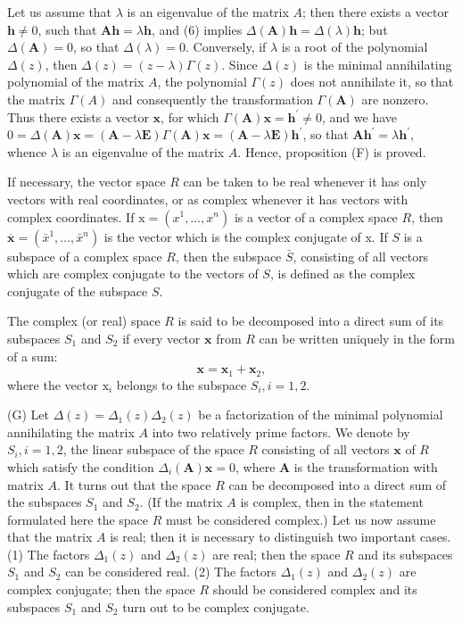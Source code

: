 \documentclass[10pt,a5paper]{book}
\theoremstyle{plain}
\theoremstyle{definition}
\theoremstyle{remark}
\begin{document}
Let us assume that $\lambda$ is an eigenvalue of the matrix $A$; then there exists a vector $\mathbf{h} \neq 0$, such that $\mathbf{A h}=\lambda \mathbf{h}$, and (6) implies $\Delta(\mathbf{A}) \mathbf{h}=\Delta(\lambda) \mathbf{h}$; but $\Delta(\mathbf{A})=0$, so that $\Delta(\lambda)=0$. Conversely, if $\lambda$ is a root of the polynomial $\Delta(z)$, then $\Delta(z)=(z-\lambda) \Gamma(z)$. Since $\Delta(z)$ is the minimal annihilating polynomial of the matrix $A$, the polynomial $\Gamma(z)$ does not annihilate it, so that the matrix $\Gamma(A)$ and consequently the transformation $\Gamma(\mathbf{A})$ are nonzero. Thus there exists a vector $\mathbf{x}$, for which $\Gamma(\mathbf{A}) \mathbf{x}=\mathbf{h}^{\prime} \neq 0$, and we have $0=\Delta(\mathbf{A}) \mathbf{x}=(\mathbf{A}-\lambda \mathbf{E}) \Gamma(\mathbf{A}) \mathbf{x}=(\mathbf{A}-\lambda \mathbf{E}) \mathbf{h}^{\prime}$, so that
$\mathbf{A h}^{\prime}=\lambda \mathbf{h}^{\prime}$, whence $\lambda$ is an eigenvalue of the matrix $A$. Hence, proposition (F) is proved.

If necessary, the vector space $R$ can be taken to be real whenever it has only vectors with real coordinates, or as complex whenever it has vectors with complex coordinates. If $\mathrm{x}=\left(x^{1}, \ldots, x^{n}\right)$ is a vector of a complex space $R$, then $\overline{\mathbf{x}}=\left(\bar{x}^{1}, \ldots, \bar{x}^{n}\right)$ is the vector which is the complex conjugate of x. If $S$ is a subspace of a complex space $R$, then the subspace $\bar{S}$, consisting of all vectors which are complex conjugate to the vectors of $S$, is defined as the complex conjugate of the subspace $S$.

The complex (or real) space $R$ is said to be decomposed into a direct sum of its subspaces $S_{1}$ and $S_{2}$ if every vector $\mathbf{x}$ from $R$ can be written uniquely in the form of a sum:
\[
\mathbf{x}=\mathbf{x}_{1}+\mathbf{x}_{2},
\]
where the vector $\mathrm{x}_{i}$ belongs to the subspace $S_{i}, i=1,2$.

(G) Let $\Delta(z)=\Delta_{1}(z) \Delta_{2}(z)$ be a factorization of the minimal polynomial annihilating the matrix $A$ into two relatively prime factors. We denote by $S_{i}, i=1,2$, the linear subspace of the space $R$ consisting of all vectors $\mathbf{x}$ of $R$ which satisfy the condition $\Delta_{i}(\mathbf{A}) \mathbf{x}=0$, where $\mathbf{A}$ is the transformation with matrix $A$. It turns out that the space $R$ can be decomposed into a direct sum of the subspaces $S_{1}$ and $S_{2}$. (If the matrix $A$ is complex, then in the statement formulated here the space $R$ must be considered complex.) Let us now assume that the matrix $A$ is real; then it is necessary to distinguish two important cases. (1) The factors $\Delta_{1}(z)$ and $\Delta_{2}(z)$ are real; then the space $R$ and its subspaces $S_{1}$ and $S_{2}$ can be considered real. (2) The factors $\Delta_{1}(z)$ and $\Delta_{2}(z)$ are complex conjugate; then the space $R$ should be considered complex and its subspaces $S_{1}$ and $S_{2}$ turn out to be complex conjugate.
\end{document}
